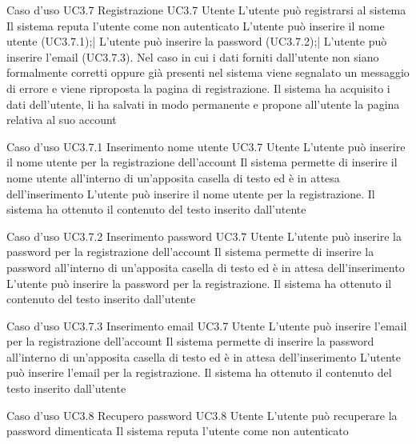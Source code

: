 \UCtitle
{Caso d'uso UC3.7}
{Registrazione}
\UC
{UC3.7}
{Utente}
{L'utente può registrarsi al sistema}
{Il sistema reputa l'utente come non autenticato}
\scenario
{L'utente può inserire il nome utente (UC3.7.1);|
L'utente può inserire la password (UC3.7.2);|
L'utente può inserire l'email (UC3.7.3).
}
\scenarioAlt
{Nel caso in cui i dati forniti dall'utente non siano formalmente corretti oppure già presenti nel sistema viene segnalato un messaggio di errore e viene riproposta la pagina di registrazione.
}
\post
{Il sistema ha acquisito i dati dell'utente, li ha salvati in modo permanente e propone all'utente la pagina relativa al suo account}

\UCtitle
{Caso d'uso UC3.7.1}
{Inserimento nome utente}
\UC
{UC3.7}
{Utente}
{L'utente può inserire il nome utente per la registrazione dell'account}
{Il sistema permette di inserire il nome utente all'interno di un'apposita casella di testo ed è in attesa dell'inserimento}
\scenario
{L'utente può inserire il nome utente per la registrazione.}
\post
{Il sistema ha ottenuto il contenuto del testo inserito dall'utente}

\UCtitle
{Caso d'uso UC3.7.2}
{Inserimento password}
\UC
{UC3.7}
{Utente}
{L'utente può inserire la password per la registrazione dell'account}
{Il sistema permette di inserire la password all'interno di un'apposita casella di testo ed è in attesa dell'inserimento}
\scenario
{L'utente può inserire la password per la registrazione.}
\post
{Il sistema ha ottenuto il contenuto del testo inserito dall'utente}

\UCtitle
{Caso d'uso UC3.7.3}
{Inserimento email}
\UC
{UC3.7}
{Utente}
{L'utente può inserire l'email per la registrazione dell'account}
{Il sistema permette di inserire la password all'interno di un'apposita casella di testo ed è in attesa dell'inserimento}
\scenario
{L'utente può inserire l'email per la registrazione.}
\post
{Il sistema ha ottenuto il contenuto del testo inserito dall'utente}

\UCtitle
{Caso d'uso UC3.8}
{Recupero password}
\UC
{UC3.8}
{Utente}
{L'utente può recuperare la password dimenticata}
{Il sistema reputa l'utente come non autenticato}
